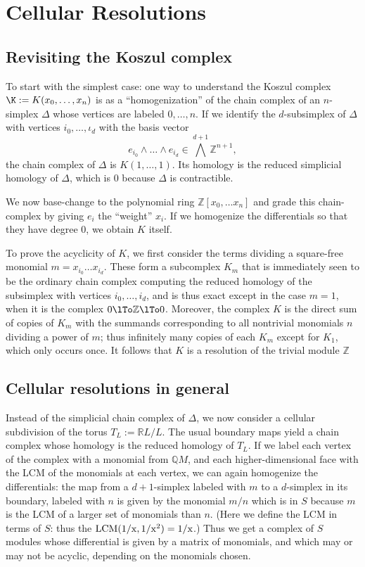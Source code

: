 \documentclass[11pt]{amsart}
\numberwithin{equation}{section}
\theoremstyle{definition}
\theoremstyle{remark}
\newcommand{\ZZ}{\mathbb Z}
\newcommand{\QQ}{\mathbb Q}
\newcommand{\RR}{\mathbb R}
\def\i{\iota}
\begin{document}
\section{Cellular Resolutions}
\subsection{Revisiting the Koszul complex}
To start with the simplest case: one way to understand the Koszul complex
$\K := K(x_{0}, \dots, x_{n})$ is as a ``homogenization'' of the chain complex of
an $n$-simplex $\Delta$ whose vertices are labeled $0,\dots, n$. If we identify the  $d$-subsimplex of $\Delta$ with vertices $i_{0}, \dots, \i_{d}$ with the basis vector
$$
e_{i_{0}}\wedge\dots\wedge e_{i_{d}} \in \bigwedge^{d+1} \ZZ^{n+1},
$$
the chain complex of $\Delta$ is $K(1,\dots, 1)$. Its homology is the reduced simplicial homology of $\Delta$, which is 0 because $\Delta$ is contractible. 

We now base-change to the polynomial ring $\ZZ[x_{0}, \dots x_{n}]$ and
 grade this chain-complex by giving $e_{i}$ the ``weight'' $x_{i}$. If we homogenize the
differentials so that they have degree 0, we obtain $K$ itself. 

To prove the acyclicity of $K$, we first consider the terms dividing a square-free monomial
$m = x_{i_{0}}\dots x_{i_{d}}$. These form a subcomplex $K_{m}$ that is immediately seen to be
the ordinary chain complex computing the reduced homology of the subsimplex with vertices $i_{0}, \dots, i_{d}$, 
and is thus exact except in the case  $m=1$, when it is the complex 
$0\lTo \ZZ\lTo 0$. Moreover, the complex $K$ is the direct sum of copies of
$ K_{m}$
with the summands corresponding to all nontrivial monomials $n$ dividing a power of $m$;
thus infinitely many copies of each $K_{m}$ except for $K_{1}$, which only occurs once.
It follows that $K$ is a resolution of the trivial module $\ZZ$

\subsection{Cellular resolutions in general} Instead of the simplicial chain complex of $\Delta$, we now consider a cellular subdivision of the torus $T_{L} := \RR L/L$. The usual boundary maps yield a chain complex whose homology is the reduced homology of $T_{L}$. If we label each vertex of the complex with a monomial from $\QQ M$, and each higher-dimensional face with the LCM of the monomials at each vertex, we can again homogenize the differentials: the map from a $d+1$-simplex labeled with $m$ to a $d$-simplex in its boundary, labeled with $n$ is given by the monomial $m/n$ which is in $S$ because
$m$ is the LCM of a larger set of monomials than $n$. (Here we define the LCM in terms of $S$: thus the $\rm{LCM}(1/x, 1/x^{2}) = 1/x$.) Thus we get a complex of $S$ modules whose differential is given by a matrix of monomials, and which may or may not be acyclic, depending on the monomials chosen.
\end{document}
